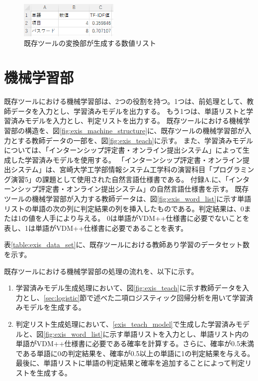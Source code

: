 \begin{figure}[tp]
    \begin{center}
        \includegraphics[width=180]{image/exis_suti_list.png}
        \caption{既存ツールの変換部が生成する数値リスト}
        \label{fig:exis_suti_list}
    \end{center}
\end{figure}

\section{機械学習部}
\label{sec:exis_machine}
既存ツールにおける機械学習部は、2つの役割を持つ。1つは、前処理として、教師データを入力とし、学習済みモデルを出力する。
もう1つは、単語リストと学習済みモデルを入力とし、判定リストを出力する。
既存ツールにおける機械学習部の構造を、図\ref{fig:exis_machine_structure}に、既存ツールの機械学習部が入力とする教師データの一部を、図\ref{fig:exis_teach}に示す。
また、学習済みモデルについては、「インターンシップ評定書・オンライン提出システム」によって生成した学習済みモデルを使用する。
「インターンシップ評定書・オンライン提出システム」は、宮崎大学工学部情報システム工学科の演習科目「プログラミング演習5」の課題として使用された自然言語仕様書である。
付録A.に、「インターンシップ評定書・オンライン提出システム」の自然言語仕様書を示す。
既存ツールの機械学習部が入力する教師データは、図\ref{fig:exis_word_list}に示す単語リストの単語の次の列に判定結果の列を挿入したものである。判定結果は、0または1の値を人手により与える。
0は単語がVDM++仕様書に必要でないことを表し、1は単語がVDM++仕様書に必要であることを表す。

表\ref{table:exis_data_set}に、既存ツールにおける教師あり学習のデータセット数を示す。

既存ツールにおける機械学習部の処理の流れを、以下に示す。

\begin{enumerate}
    \item 学習済みモデル生成処理において、図\ref{fig:exis_teach}に示す教師データを入力とし、\ref{sec:logistic}節で述べた二項ロジスティック回帰分析を用いて学習済みモデルを生成する。
    \label{exis_teach_model}
    \item 判定リスト生成処理において、\ref{exis_teach_model}で生成した学習済みモデルと、図\ref{fig:exis_word_list}に示す単語リストを入力とし、単語リスト内の単語がVDM++仕様書に必要である確率を計算する。さらに、確率が0.5未満である単語に0の判定結果を、確率が0.5以上の単語に1の判定結果を与える。最後に、単語リストに単語の判定結果と確率を追加することによって判定リストを生成する。
\end{enumerate}

